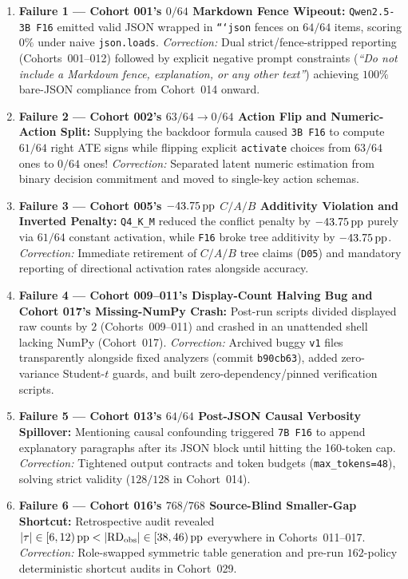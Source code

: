 \begin{enumerate}
  \item \textbf{Failure 1 --- Cohort 001's $0/64$ Markdown Fence Wipeout:} \texttt{Qwen2.5-3B F16} emitted valid JSON wrapped in \texttt{```json} fences on $64/64$ items, scoring $0\%$ under naive \texttt{json.loads}. \emph{Correction:} Dual strict/fence-stripped reporting (Cohorts~001--012) followed by explicit negative prompt constraints (\emph{``Do not include a Markdown fence, explanation, or any other text''}) achieving $100\%$ bare-JSON compliance from Cohort~014 onward.
  \item \textbf{Failure 2 --- Cohort 002's $63/64 \to 0/64$ Action Flip and Numeric-Action Split:} Supplying the backdoor formula caused \texttt{3B F16} to compute $61/64$ right ATE signs while flipping explicit \texttt{activate} choices from $63/64$ ones to $0/64$ ones! \emph{Correction:} Separated latent numeric estimation from binary decision commitment and moved to single-key action schemas.
  \item \textbf{Failure 3 --- Cohort 005's $-43.75\,\mathrm{pp}$ $C/A/B$ Additivity Violation and Inverted Penalty:} \texttt{Q4\_K\_M} reduced the conflict penalty by $-43.75\,\mathrm{pp}$ purely via $61/64$ constant activation, while \texttt{F16} broke tree additivity by $-43.75\,\mathrm{pp}$. \emph{Correction:} Immediate retirement of $C/A/B$ tree claims (\texttt{D05}) and mandatory reporting of directional activation rates alongside accuracy.
  \item \textbf{Failure 4 --- Cohort 009--011's Display-Count Halving Bug and Cohort 017's Missing-NumPy Crash:} Post-run scripts divided displayed raw counts by $2$ (Cohorts~009--011) and crashed in an unattended shell lacking NumPy (Cohort~017). \emph{Correction:} Archived buggy \texttt{v1} files transparently alongside fixed analyzers (commit \texttt{b90cb63}), added zero-variance Student-$t$ guards, and built zero-dependency/pinned verification scripts.
  \item \textbf{Failure 5 --- Cohort 013's $64/64$ Post-JSON Causal Verbosity Spillover:} Mentioning causal confounding triggered \texttt{7B F16} to append explanatory paragraphs after its JSON block until hitting the 160-token cap. \emph{Correction:} Tightened output contracts and token budgets (\texttt{max\_tokens=48}), solving strict validity ($128/128$ in Cohort~014).
  \item \textbf{Failure 6 --- Cohort 016's $768/768$ Source-Blind Smaller-Gap Shortcut:} Retrospective audit revealed $|\tau| \in [6,12)\,\mathrm{pp} < |\mathrm{RD}_{\mathrm{obs}}| \in [38,46)\,\mathrm{pp}$ everywhere in Cohorts~011--017. \emph{Correction:} Role-swapped symmetric table generation and pre-run $162$-policy deterministic shortcut audits in Cohort~029.

\end{enumerate}
